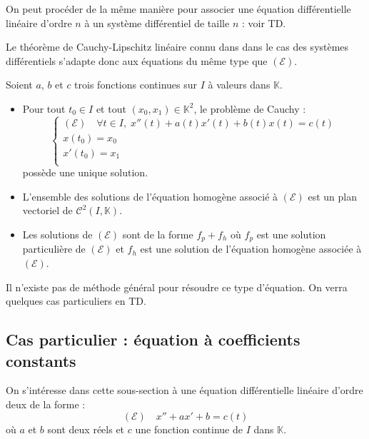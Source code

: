 \documentclass[a4paper,10pt]{report}
\begin{document}
\begin{rem} On peut procéder de la même manière pour associer une équation différentielle linéaire d'ordre $n$ à un système différentiel de taille $n$ : voir TD.
\end{rem}

\medskip

\noindent Le théorème de Cauchy-Lipschitz linéaire connu dans dans le cas des systèmes différentiels s'adapte donc aux équations du même type que $(\mathcal{E})$.

\begin{thm} Soient $a$, $b$ et $c$ trois fonctions continues sur $I$ à valeurs dans $\mathbb{K}$.

\begin{itemize}
\item Pour tout $t_0 \in I$ et tout $(x_0,x_1) \in \mathbb{K}^2$, le problème de Cauchy :
$$ \left\lbrace \begin{array}{l}
(\mathcal{E}) \quad \forall t \in I, \; x''(t)+a(t)x'(t)+b(t)x(t) = c(t)  \\
x(t_0)=x_0 \\
x'(t_0) = x_1 \\
\end{array}\right.$$
possède une unique solution.
\item L'ensemble des solutions de l'équation homogène associé à $(\mathcal{E})$ est un plan vectoriel de $\mathcal{C}^2(I, \mathbb{K})$.
\item Les solutions de $(\mathcal{E})$ sont de la forme $f_p + f_h$ où $f_p$ est une solution particulière de $(\mathcal{E})$ et $f_h$ est une solution de l'équation homogène associée à $(\mathcal{E})$.
\end{itemize}
\end{thm}

\begin{rem} Il n'existe pas de méthode général pour résoudre ce type d'équation. On verra quelques cas particuliers en TD.
\end{rem}

\subsection{Cas particulier : équation à coefficients constants}

\noindent On s'intéresse dans cette sous-section à une équation différentielle linéaire d'ordre deux de la forme :
$$ (\mathcal{E}) \quad x''+ax'+b=c(t)$$
où $a$ et $b$ sont deux réels et $c$ une fonction continue de $I$ dans $\mathbb{K}$.
\end{document}
